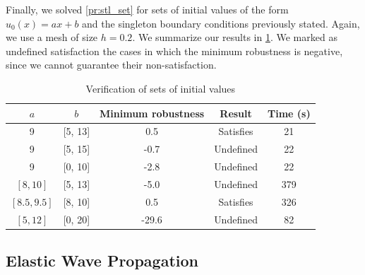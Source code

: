 \documentclass[letterpaper, 10 pt, conference]{ieeeconf/ieeeconf}
\begin{document}
Finally, we solved \cref{pr:stl_set} for sets of initial values of the
form $u_0(x) = a x + b$ and the singleton boundary conditions previously stated.
Again, we use a
mesh of size $h = 0.2$. We summarize our results in \cref{tab:res_sets}. We
marked as undefined satisfaction the cases in which the minimum robustness is
negative, since we cannot guarantee their non-satisfaction.

\begin{table}
\caption{Verification of sets of initial values}
\label{tab:res_sets}
\centering
\begin{tabular}{|c|c|c|c|c|}
    \hline
    $a$ & $b$ & Minimum robustness & Result & Time (s)  \\
    \hline
    9 & [5, 13] & 0.5 & Satisfies & 21 \\
    9 & [5, 15] & -0.7 & Undefined & 22 \\
    9 & [0, 10] & -2.8 & Undefined & 22 \\
    $[8, 10]$ & [5, 13] & -5.0 & Undefined & 379 \\
    $[8.5, 9.5]$ & [8, 10] & 0.5 & Satisfies & 326 \\
    $[5, 12]$ & [0, 20] & -29.6 & Undefined & 82 \\
    \hline
\end{tabular}
\end{table}

\subsection{Elastic Wave Propagation}
\label{sub:linear_elasticity}
\end{document}
